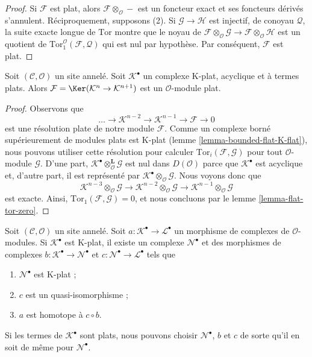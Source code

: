 \begin{proof}
Si $\mathcal{F}$ est plat, alors $\mathcal{F} \otimes_\mathcal{O} -$ est un
foncteur exact et ses foncteurs dérivés s'annulent. Réciproquement, supposons
(2). Si $\mathcal{G} \to \mathcal{H}$ est injectif, de conoyau $\mathcal{Q}$,
la suite exacte longue de $\text{Tor}$ montre que le noyau de
$\mathcal{F} \otimes_\mathcal{O} \mathcal{G} \to
\mathcal{F} \otimes_\mathcal{O} \mathcal{H}$
est un quotient de
$\text{Tor}_1^\mathcal{O}(\mathcal{F}, \mathcal{Q})$
qui est nul par hypothèse. Par conséquent, $\mathcal{F}$ est plat.
\end{proof}

\begin{lemma}
\label{lemma-K-flat-flat-acyclic}
Soit $(\mathcal{C}, \mathcal{O})$ un site annelé. Soit $\mathcal{K}^\bullet$
un complexe K-plat, acyclique et à termes plats. Alors
$\mathcal{F} = \Ker(\mathcal{K}^n \to \mathcal{K}^{n + 1})$
est un $\mathcal{O}$-module plat.
\end{lemma}

\begin{proof}
Observons que
$$
\ldots \to \mathcal{K}^{n - 2} \to \mathcal{K}^{n - 1} \to
\mathcal{F} \to 0
$$
est une résolution plate de notre module $\mathcal{F}$. Comme un complexe
borné supérieurement de modules plats est K-plat
(lemme \ref{lemma-bounded-flat-K-flat}), nous pouvons utiliser cette résolution
pour calculer $\text{Tor}_i(\mathcal{F}, \mathcal{G})$ pour tout
$\mathcal{O}$-module $\mathcal{G}$. D'une part,
$\mathcal{K}^\bullet \otimes_\mathcal{O}^\mathbf{L} \mathcal{G}$ est nul dans
$D(\mathcal{O})$ parce que $\mathcal{K}^\bullet$ est acyclique et, d'autre
part, il est représenté par
$\mathcal{K}^\bullet \otimes_\mathcal{O} \mathcal{G}$.
Nous voyons donc que
$$
\mathcal{K}^{n - 3} \otimes_\mathcal{O} \mathcal{G} \to
\mathcal{K}^{n - 2} \otimes_\mathcal{O} \mathcal{G} \to
\mathcal{K}^{n - 1} \otimes_\mathcal{O} \mathcal{G}
$$
est exacte. Ainsi, $\text{Tor}_1(\mathcal{F}, \mathcal{G}) = 0$, et nous
concluons par le lemme \ref{lemma-flat-tor-zero}.
\end{proof}

\begin{lemma}
\label{lemma-factor-through-K-flat}
Soit $(\mathcal{C}, \mathcal{O})$ un site annelé.
Soit $a : \mathcal{K}^\bullet \to \mathcal{L}^\bullet$ un morphisme de
complexes de $\mathcal{O}$-modules. Si $\mathcal{K}^\bullet$ est K-plat, il
existe un complexe $\mathcal{N}^\bullet$ et des morphismes de complexes
$b : \mathcal{K}^\bullet \to \mathcal{N}^\bullet$
et $c : \mathcal{N}^\bullet \to \mathcal{L}^\bullet$ tels que
\begin{enumerate}
\item $\mathcal{N}^\bullet$ est K-plat ;
\item $c$ est un quasi-isomorphisme ;
\item $a$ est homotope à $c \circ b$.
\end{enumerate}
Si les termes de $\mathcal{K}^\bullet$ sont plats, nous pouvons choisir
$\mathcal{N}^\bullet$, $b$ et $c$ de sorte qu'il en soit de même pour
$\mathcal{N}^\bullet$.
\end{lemma}


